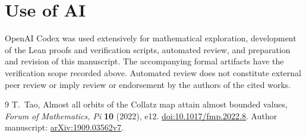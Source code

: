 \documentclass[11pt]{article}
\theoremstyle{remark}
\begin{document}
\section*{Use of AI}
OpenAI Codex was used extensively for mathematical exploration,
development of the Lean proofs and verification scripts, automated
review, and preparation and revision of this manuscript.
The accompanying formal artifacts have the verification scope
recorded above.  Automated review does not constitute external peer
review or imply review or endorsement by the authors of the cited works.

\begin{thebibliography}{9}
T.~Tao,
Almost all orbits of the Collatz map attain almost bounded values,
\emph{Forum of Mathematics, Pi} \textbf{10} (2022), e12.
\href{https://doi.org/10.1017/fmp.2022.8}
{doi:10.1017/fmp.2022.8}.
Author manuscript: \href{https://arxiv.org/abs/1909.03562v7}
{arXiv:1909.03562v7}.
\end{thebibliography}
\end{document}
